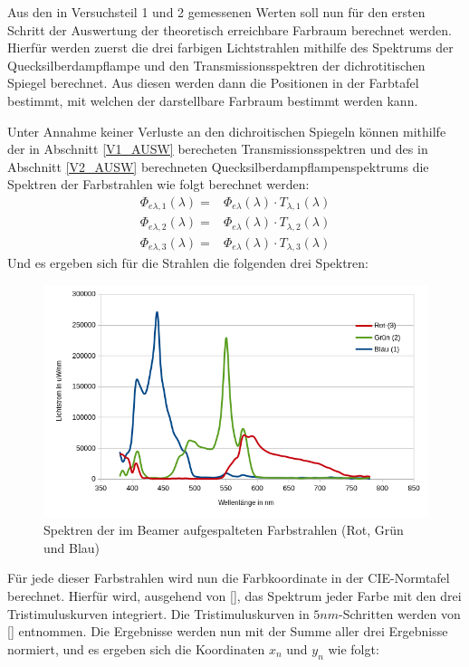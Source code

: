 \label{sec:Erwartungswerte}

Aus den in Versuchsteil 1 und 2 gemessenen Werten soll nun für den ersten Schritt der Auswertung der theoretisch erreichbare Farbraum berechnet werden. Hierfür werden zuerst die drei farbigen Lichtstrahlen mithilfe des Spektrums der Quecksilberdampflampe und den Transmissionsspektren der dichrotitischen Spiegel berechnet. Aus diesen werden dann die Positionen in der Farbtafel bestimmt, mit welchen der darstellbare Farbraum bestimmt werden kann.

Unter Annahme keiner Verluste an den dichroitischen Spiegeln können mithilfe der in Abschnitt \ref{V1_AUSW} berecheten Transmissionsspektren und des in Abschnitt \ref{V2_AUSW} berechneten Quecksilberdampflampenspektrums die Spektren der Farbstrahlen wie folgt berechnet werden:
\begin{eqnarray}
\Phi_{e\lambda,1}(\lambda) = & \Phi_{e\lambda}(\lambda)\cdot  T_{\lambda,1}(\lambda) \\
\Phi_{e\lambda,2}(\lambda) = & \Phi_{e\lambda}(\lambda)\cdot  T_{\lambda,2}(\lambda) \\
\Phi_{e\lambda,3}(\lambda) = & \Phi_{e\lambda}(\lambda) \cdot T_{\lambda,3}(\lambda)
\end{eqnarray}
Und es ergeben sich für die Strahlen die folgenden drei Spektren:

\begin{figure}[h]
	\centering
	\includegraphics[scale=0.7]{Images/A_Farbstrahlen.png}
	\caption{Spektren der im Beamer aufgespalteten Farbstrahlen (Rot, Grün und Blau)}
\end{figure}
Für jede dieser Farbstrahlen wird nun die Farbkoordinate in der CIE-Normtafel berechnet. Hierfür wird, ausgehend von [\cite[Seite 26]{AML_SKRIPT}], das Spektrum jeder Farbe mit den drei Tristimuluskurven integriert. Die Tristimuluskurven in $5nm$-Schritten werden von [\cite[Seite 34]{AML_SKRIPT}] entnommen. Die Ergebnisse werden nun mit der Summe aller drei Ergebnisse normiert, und es ergeben sich die Koordinaten $x_n$ und $y_n$ wie folgt:

